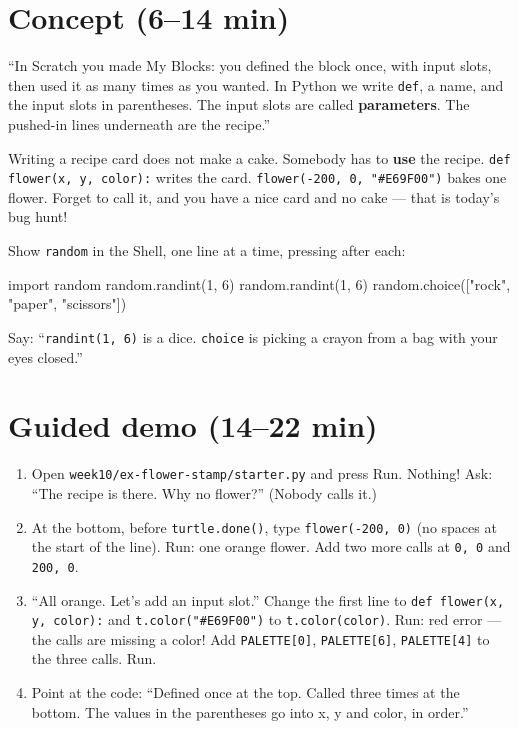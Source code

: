 \section{Concept (6--14 min)}
\begin{teacherscript}
\enquote{In Scratch you made My Blocks: you defined the block once, with input slots, then used it as many times as you wanted. In Python we write \texttt{def}, a name, and the input slots in parentheses. The input slots are called \textbf{parameters}. The pushed-in lines underneath are the recipe.}
\end{teacherscript}
\begin{analogy}
Writing a recipe card does not make a cake. Somebody has to \textbf{use} the recipe. \texttt{def flower(x, y, color):} writes the card. \texttt{flower(-200, 0, "\#E69F00")} bakes one flower. Forget to call it, and you have a nice card and no cake --- that is today's bug hunt!
\end{analogy}
Show \texttt{random} in the Shell, one line at a time, pressing  after each:
\begin{pycode}
import random
random.randint(1, 6)
random.randint(1, 6)
random.choice(["rock", "paper", "scissors"])
\end{pycode}
Say: \enquote{\texttt{randint(1, 6)} is a dice. \texttt{choice} is picking a crayon from a bag with your eyes closed.}

\section{Guided demo (14--22 min)}
\begin{workedexample}
\begin{enumerate}[leftmargin=1.4em,itemsep=1pt]
  \item Open \texttt{week10/ex-flower-stamp/starter.py} and press Run. Nothing! Ask: \enquote{The recipe is there. Why no flower?} (Nobody calls it.)
  \item At the bottom, before \texttt{turtle.done()}, type \texttt{flower(-200, 0)} (no spaces at the start of the line). Run: one orange flower. Add two more calls at \texttt{0, 0} and \texttt{200, 0}.
  \item \enquote{All orange. Let's add an input slot.} Change the first line to \texttt{def flower(x, y, color):} and \texttt{t.color("\#E69F00")} to \texttt{t.color(color)}. Run: red error --- the calls are missing a color! Add \texttt{PALETTE[0]}, \texttt{PALETTE[6]}, \texttt{PALETTE[4]} to the three calls. Run.
  \item Point at the code: \enquote{Defined once at the top. Called three times at the bottom. The values in the parentheses go into x, y and color, in order.}
\end{enumerate}
\end{workedexample}

